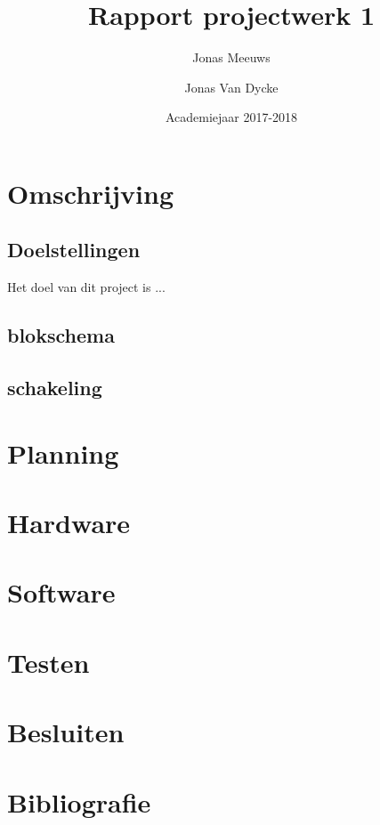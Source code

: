 \documentclass[a4paper]{report}
\title{Rapport projectwerk 1}
\author{Jonas Meeuws \and Jonas Van Dycke}
\date{Academiejaar 2017-2018}
\begin{document}
\maketitle
\tableofcontents

\chapter{Omschrijving}
\section{Doelstellingen}
Het doel van dit project is ...
\section{blokschema}
\section{schakeling}

\chapter{Planning}

\chapter{Hardware}

\chapter{Software}

\chapter{Testen}

\chapter{Besluiten}

\chapter{Bibliografie}
\end{document}
